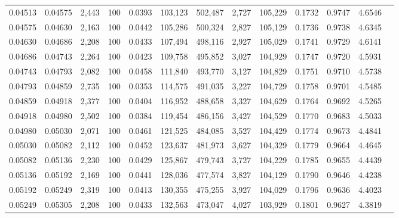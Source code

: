 \begin{tabular}{rrrrrrrrrrrrr}
0.04513 & 0.04575 & 2,443 & 100 &                                     0.0393 & 103,123 & 502,487 &   2,727 & 105,229 & 0.1732 & 0.9747 & 4.6546 \\
0.04575 & 0.04630 & 2,163 & 100 &                                     0.0442 & 105,286 & 500,324 &   2,827 & 105,129 & 0.1736 & 0.9738 & 4.6345 \\
0.04630 & 0.04686 & 2,208 & 100 &                                     0.0433 & 107,494 & 498,116 &   2,927 & 105,029 & 0.1741 & 0.9729 & 4.6141 \\
0.04686 & 0.04743 & 2,264 & 100 &                                     0.0423 & 109,758 & 495,852 &   3,027 & 104,929 & 0.1747 & 0.9720 & 4.5931 \\
0.04743 & 0.04793 & 2,082 & 100 &                                     0.0458 & 111,840 & 493,770 &   3,127 & 104,829 & 0.1751 & 0.9710 & 4.5738 \\
0.04793 & 0.04859 & 2,735 & 100 &                                     0.0353 & 114,575 & 491,035 &   3,227 & 104,729 & 0.1758 & 0.9701 & 4.5485 \\
0.04859 & 0.04918 & 2,377 & 100 &                                     0.0404 & 116,952 & 488,658 &   3,327 & 104,629 & 0.1764 & 0.9692 & 4.5265 \\
0.04918 & 0.04980 & 2,502 & 100 &                                     0.0384 & 119,454 & 486,156 &   3,427 & 104,529 & 0.1770 & 0.9683 & 4.5033 \\
0.04980 & 0.05030 & 2,071 & 100 &                                     0.0461 & 121,525 & 484,085 &   3,527 & 104,429 & 0.1774 & 0.9673 & 4.4841 \\
0.05030 & 0.05082 & 2,112 & 100 &                                     0.0452 & 123,637 & 481,973 &   3,627 & 104,329 & 0.1779 & 0.9664 & 4.4645 \\
0.05082 & 0.05136 & 2,230 & 100 &                                     0.0429 & 125,867 & 479,743 &   3,727 & 104,229 & 0.1785 & 0.9655 & 4.4439 \\
0.05136 & 0.05192 & 2,169 & 100 &                                     0.0441 & 128,036 & 477,574 &   3,827 & 104,129 & 0.1790 & 0.9646 & 4.4238 \\
0.05192 & 0.05249 & 2,319 & 100 &                                     0.0413 & 130,355 & 475,255 &   3,927 & 104,029 & 0.1796 & 0.9636 & 4.4023 \\
0.05249 & 0.05305 & 2,208 & 100 &                                     0.0433 & 132,563 & 473,047 &   4,027 & 103,929 & 0.1801 & 0.9627 & 4.3819 \\

\end{tabular}
